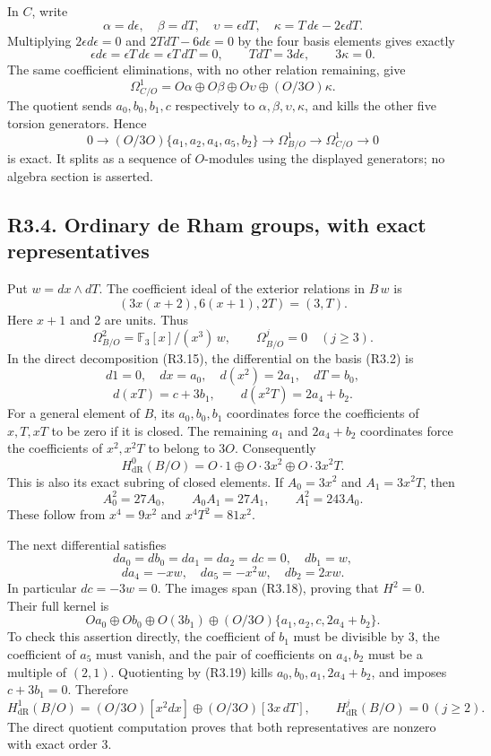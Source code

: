 \documentclass[
  10pt,
]{article}
\begin{document}
In \(C\), write \[
\alpha=d\epsilon,\quad \beta=dT,\quad
\upsilon=\epsilon dT,\quad
\kappa=T\,d\epsilon-2\epsilon dT.
\] Multiplying \(2\epsilon d\epsilon=0\) and \(2TdT-6d\epsilon=0\) by
the four basis elements gives exactly \[
\epsilon d\epsilon=\epsilon T\,d\epsilon=\epsilon T\,dT=0,\qquad
TdT=3d\epsilon,\qquad3\kappa=0.
\] The same coefficient eliminations, with no other relation remaining,
give \[
\Omega^1_{C/O}
=O\alpha\oplus O\beta\oplus O\upsilon\oplus(O/3O)\kappa.
\tag{R3.16}
\] The quotient sends \(a_0,b_0,b_1,c\) respectively to
\(\alpha,\beta,\upsilon,\kappa\), and kills the other five torsion
generators. Hence \[
0\longrightarrow(O/3O)\{a_1,a_2,a_4,a_5,b_2\}
\longrightarrow\Omega^1_{B/O}
\longrightarrow\Omega^1_{C/O}
\longrightarrow0
\tag{R3.17}
\] is exact. It splits as a sequence of \(O\)-modules using the
displayed generators; no algebra section is asserted.

\subsection{R3.4. Ordinary de Rham groups, with exact
representatives}\label{r3.4.-ordinary-de-rham-groups-with-exact-representatives}

Put \(w=dx\wedge dT\). The coefficient ideal of the exterior relations
in \(B\,w\) is \[
(3x(x+2),6(x+1),2T)=(3,T).
\] Here \(x+1\) and 2 are units. Thus \[
\Omega^2_{B/O}=\mathbb F_3[x]/(x^3)\,w,\qquad
\Omega^j_{B/O}=0\quad(j\ge3).
\tag{R3.18}
\] In the direct decomposition (R3.15), the differential on the basis
(R3.2) is \[
d1=0,\quad dx=a_0,\quad d(x^2)=2a_1,\quad dT=b_0,
\] \[
d(xT)=c+3b_1,\qquad d(x^2T)=2a_4+b_2.
\tag{R3.19}
\] For a general element of \(B\), its \(a_0,b_0,b_1\) coordinates force
the coefficients of \(x,T,xT\) to be zero if it is closed. The remaining
\(a_1\) and \(2a_4+b_2\) coordinates force the coefficients of
\(x^2,x^2T\) to belong to \(3O\). Consequently \[
H^0_{\mathrm{dR}}(B/O)
=O\cdot1\oplus O\cdot3x^2\oplus O\cdot3x^2T.
\tag{R3.20}
\] This is also its exact subring of closed elements. If \(A_0=3x^2\)
and \(A_1=3x^2T\), then \[
A_0^2=27A_0,\qquad A_0A_1=27A_1,\qquad A_1^2=243A_0.
\] These follow from \(x^4=9x^2\) and \(x^4T^2=81x^2\).

The next differential satisfies \[
da_0=db_0=da_1=da_2=dc=0,\quad db_1=w,
\] \[
da_4=-xw,\quad da_5=-x^2w,\quad db_2=2xw.
\tag{R3.21}
\] In particular \(dc=-3w=0\). The images span (R3.18), proving that
\(H^2=0\). Their full kernel is \[
Oa_0\oplus Ob_0\oplus O(3b_1)
\oplus(O/3O)\{a_1,a_2,c,2a_4+b_2\}.
\] To check this assertion directly, the coefficient of \(b_1\) must be
divisible by 3, the coefficient of \(a_5\) must vanish, and the pair of
coefficients on \(a_4,b_2\) must be a multiple of \((2,1)\). Quotienting
by (R3.19) kills \(a_0,b_0,a_1,2a_4+b_2\), and imposes \(c+3b_1=0\).
Therefore \[
H^1_{\mathrm{dR}}(B/O)
=(O/3O)[x^2dx]\oplus(O/3O)[3x\,dT],
\qquad H^j_{\mathrm{dR}}(B/O)=0\ (j\ge2).
\tag{R3.22}
\] The direct quotient computation proves that both representatives are
nonzero with exact order 3.
\end{document}
